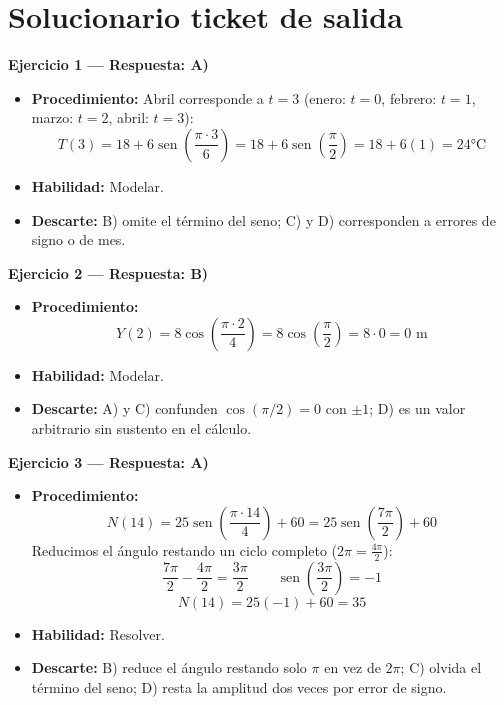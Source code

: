 \documentclass[12pt,letterpaper]{article}
\providecommand{\sen}{\operatorname{sen}}
\begin{document}
\section{Solucionario ticket de salida}

\textbf{Ejercicio 1 --- Respuesta: A)}
\begin{itemize}[leftmargin=*]
    \item \textbf{Procedimiento:} Abril corresponde a $t=3$ (enero: $t=0$, febrero: $t=1$, marzo: $t=2$, abril: $t=3$):
          \[ T(3)=18+6\sen\left(\frac{\pi\cdot3}{6}\right)=18+6\sen\left(\frac{\pi}{2}\right)=18+6(1)=24°\text{C} \]
    \item \textbf{Habilidad:} Modelar.
    \item \textbf{Descarte:} B) omite el término del seno; C) y D) corresponden a errores de signo o de mes.
\end{itemize}



\textbf{Ejercicio 2 --- Respuesta: B)}
\begin{itemize}[leftmargin=*]
    \item \textbf{Procedimiento:}
          \[ Y(2)=8\cos\left(\frac{\pi\cdot2}{4}\right)=8\cos\left(\frac{\pi}{2}\right)=8\cdot0=0\text{ m} \]
    \item \textbf{Habilidad:} Modelar.
    \item \textbf{Descarte:} A) y C) confunden $\cos(\pi/2)=0$ con $\pm1$; D) es un valor arbitrario sin sustento en el cálculo.
\end{itemize}

\vspace{1.2cm}

\textbf{Ejercicio 3 --- Respuesta: A)}
\begin{itemize}[leftmargin=*]
    \item \textbf{Procedimiento:}
          \[ N(14)=25\sen\left(\frac{\pi\cdot14}{4}\right)+60=25\sen\left(\frac{7\pi}{2}\right)+60 \]
          Reducimos el ángulo restando un ciclo completo ($2\pi=\frac{4\pi}{2}$):
          \[ \frac{7\pi}{2}-\frac{4\pi}{2}=\frac{3\pi}{2} \qquad \sen\left(\frac{3\pi}{2}\right)=-1 \]
          \[ N(14)=25(-1)+60=35 \]
    \item \textbf{Habilidad:} Resolver.
    \item \textbf{Descarte:} B) reduce el ángulo restando solo $\pi$ en vez de $2\pi$; C) olvida el término del seno; D) resta la amplitud dos veces por error de signo.
\end{itemize}
\end{document}
